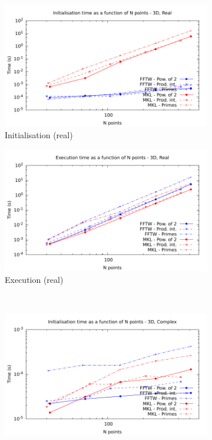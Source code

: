 \documentclass[12pt, a4paper]{article} \setlength{\textheight}{24cm}
\begin{document}
\begin{figure}[H]
  \captionsetup{width=0.8\linewidth}
  \centering
  \begin{subfigure}{.5\textwidth}
    \centering
    \includegraphics[width=.9\linewidth]{graphs/3d-init-r.pdf}
    \caption{Initialisation (real)}
    \label{3DRI}
  \end{subfigure}%
  \begin{subfigure}{.5\textwidth}
    \centering
    \includegraphics[width=.9\linewidth]{graphs/3d-exec-r.pdf}
    \caption{Execution (real)}
    \label{3DR}
  \end{subfigure}\\
  \begin{subfigure}{.5\textwidth}
    \centering
    \includegraphics[width=.9\linewidth]{graphs/3d-init-c.pdf}

\end{subfigure}
\end{figure}
\end{document}
